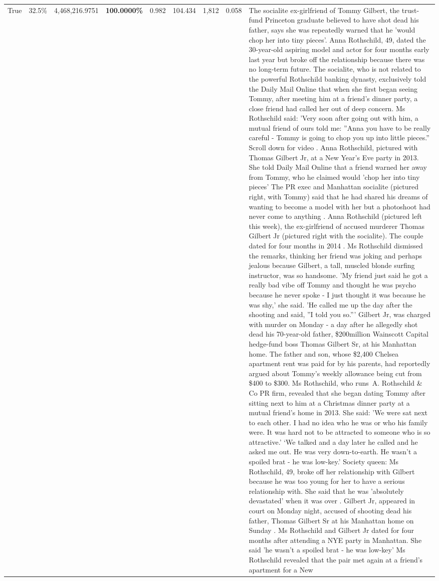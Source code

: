\begin{table}[H]
\begin{tabular}{lllrlllll}
True & 32.5\% & 4,468,216.9751 & \bfseries \color{red} 100.0000\% & 0.982 & 104.434 & 1,812 & 0.058 & The socialite ex-girlfriend of Tommy Gilbert, the trust-fund Princeton graduate believed to have shot dead his father, says she was repeatedly warned that he 'would chop her into tiny pieces'. Anna Rothschild, 49, dated the 30-year-old aspiring model and actor for four months early last year but broke off the relationship because there was no long-term future. The socialite, who is not related to the powerful Rothschild banking dynasty, exclusively told the Daily Mail Online that when she first began seeing Tommy, after meeting him at a friend's dinner party, a close friend had called her out of deep concern. Ms Rothschild said: 'Very soon after going out with him, a mutual friend of ours told me: ''Anna you have to be really careful - Tommy is going to chop you up into little pieces.'' Scroll down for video . Anna Rothschild, pictured with Thomas Gilbert Jr, at a New Year's Eve party in 2013. She told Daily Mail Online that a friend warned her away from Tommy, who he claimed would 'chop her into tiny pieces' The PR exec and Manhattan socialite (pictured right, with Tommy) said that he had shared his dreams of wanting to become a model with her but a photoshoot had never come to anything . Anna Rothschild (pictured left this week), the ex-girlfriend of accused murderer Thomas Gilbert Jr (pictured right with the socialite). The couple dated for four months in 2014 . Ms Rothschild dismissed the remarks, thinking her friend was joking and perhaps jealous because Gilbert, a tall, muscled blonde surfing instructor, was so handsome. 'My friend just said he got a really bad vibe off Tommy and thought he was psycho because he never spoke - I just thought it was because he was shy,' she said. 'He called me up the day after the shooting and said, ''I told you so.''' Gilbert Jr, was charged with murder on Monday - a day after he allegedly shot dead his 70-year-old father, \$200million Wainscott Capital hedge-fund boss Thomas Gilbert Sr, at his Manhattan home. The father and son, whose \$2,400 Chelsea apartment rent was paid for by his parents, had reportedly argued about Tommy's weekly allowance being cut from \$400 to \$300. Ms Rothschild, who runs A. Rothschild \& Co PR firm, revealed that she began dating Tommy after sitting next to him at a Christmas dinner party at a mutual friend's home in 2013. She said: 'We were sat next to each other. I had no idea who he was or who his family were. It was hard not to be attracted to someone who is so attractive.' ‘We talked and a day later he called and he asked me out. He was very down-to-earth. He wasn’t a spoiled brat - he was low-key.’ Society queen: Ms Rothschild, 49, broke off her relationship with Gilbert because he was too young for her to have a serious relationship with. She said that he was 'absolutely devastated' when it was over . Gilbert Jr, appeared in court on Monday night, accused of shooting dead his father, Thomas Gilbert Sr at his Manhattan home on Sunday . Ms Rothschild and Gilbert Jr dated for four months after attending a NYE party in Manhattan. She said 'he wasn't a spoiled brat - he was low-key' Ms Rothschild revealed that the pair met again at a friend’s apartment for a New 
\end{tabular}
\end{table}
